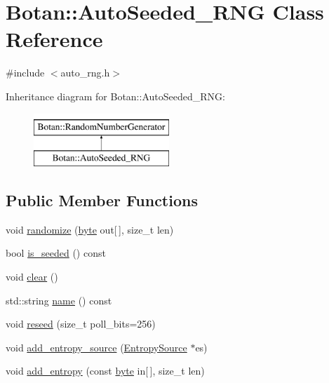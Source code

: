\hypertarget{classBotan_1_1AutoSeeded__RNG}{\section{Botan\-:\-:Auto\-Seeded\-\_\-\-R\-N\-G Class Reference}
\label{classBotan_1_1AutoSeeded__RNG}
}


{\ttfamily \#include $<$auto\-\_\-rng.\-h$>$}

Inheritance diagram for Botan\-:\-:Auto\-Seeded\-\_\-\-R\-N\-G\-:\begin{figure}[H]
\begin{center}
\leavevmode
\includegraphics[height=2.000000cm]{classBotan_1_1AutoSeeded__RNG}
\end{center}
\end{figure}
\subsection*{Public Member Functions}
\begin{DoxyCompactItemize}
\item 
void \hyperlink{classBotan_1_1AutoSeeded__RNG_a5f5d3ce8251b5de3ff897442e3bec9a1}{randomize} (\hyperlink{namespaceBotan_a7d793989d801281df48c6b19616b8b84}{byte} out\mbox{[}$\,$\mbox{]}, size\-\_\-t len)
\item 
bool \hyperlink{classBotan_1_1AutoSeeded__RNG_a81ea42d8dbc7933d64dcdd0d3701e61f}{is\-\_\-seeded} () const 
\item 
void \hyperlink{classBotan_1_1AutoSeeded__RNG_ad709854b14e8e356b40b7925f6d650f8}{clear} ()
\item 
std\-::string \hyperlink{classBotan_1_1AutoSeeded__RNG_a20299f360d2194d09d1f6791ae51cbb7}{name} () const 
\item 
void \hyperlink{classBotan_1_1AutoSeeded__RNG_ac312d4ef6caeeaa56093d0a0d0ad14ad}{reseed} (size\-\_\-t poll\-\_\-bits=256)
\item 
void \hyperlink{classBotan_1_1AutoSeeded__RNG_a1ddabdbd03aca59cd06b40c2f853c6f1}{add\-\_\-entropy\-\_\-source} (\hyperlink{classBotan_1_1EntropySource}{Entropy\-Source} $\ast$es)
\item 
void \hyperlink{classBotan_1_1AutoSeeded__RNG_a36c400b28769962398be00897dc631ba}{add\-\_\-entropy} (const \hyperlink{namespaceBotan_a7d793989d801281df48c6b19616b8b84}{byte} in\mbox{[}$\,$\mbox{]}, size\-\_\-t len)
\end{DoxyCompactItemize}
